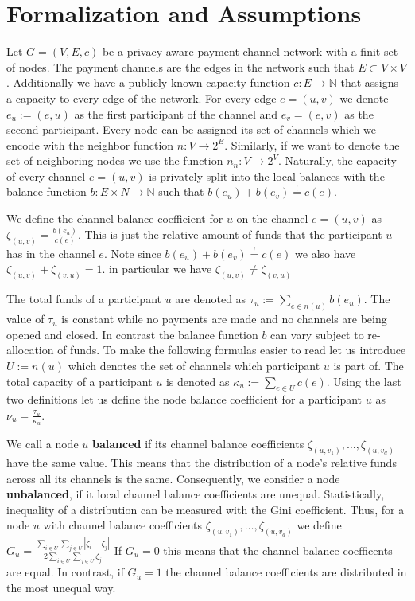 \documentclass[a4paper]{paper}
\begin{document}
\section{Formalization and Assumptions}
\label{sec:formalization}

Let $G=(V,E,c)$ be a privacy aware payment channel network with a finit set of nodes.
The payment channels are the edges in the network such that $E\subset V\times V$.
Additionally we have a publicly known capacity function $c: E\longrightarrow \mathbb{N}$ that assigns a capacity to every edge of the network.
For every edge $e=(u,v)$ we denote $e_u:=(e,u)$ as the first participant of the channel and $e_v=(e,v)$ as the second participant.
Every node can be assigned its set of channels which we encode with the neighbor function $n : V \longrightarrow 2^{E}$.
Similarly, if we want to denote the set of neighboring nodes we use the function $n_n : V \longrightarrow 2^{V}$.
Naturally, the capacity of every channel $e=(u,v)$ is privately split into the local balances with the balance function $b: E\times N\longrightarrow\mathbb{N}$ such that $b(e_u)+b(e_v)\stackrel{!}{=}c(e)$.

We define the channel balance coefficient for $u$ on the channel $e=(u,v)$ as  $\zeta_{(u,v)} = \frac{b(e_u)}{c(e)}$.
This is just the relative amount of funds that the participant $u$ has in the channel $e$.
Note since $b(e_u)+b(e_v)\stackrel{!}{=}c(e)$ we also have $\zeta_{(u,v)} + \zeta_{(v,u)}=1$.
in particular we have $\zeta_{(u,v)} \neq \zeta_{(v,u)}$ 

The total funds of a participant $u$ are denoted as $\tau_u:=\displaystyle{\sum_{e\in n(u)}b(e_u)}$.
The value of $\tau_u$ is constant while no payments are made and no channels are being opened and closed.
In contrast the balance function $b$ can vary subject to re-allocation of funds.
To make the following formulas easier to read let us introduce $U:=n(u)$ which denotes the set of channels which participant $u$ is part of.
The total capacity of a participant $u$ is denoted as $\kappa_u:=\displaystyle{\sum_{e\in U}c(e)}$.
Using the last two definitions let us define the node balance coefficient for a participant $u$ as $\nu_u = \frac{\tau_u}{\kappa_u}$.

We call a node $u$ {\bf balanced} if its channel balance coefficients $\zeta_{(u,v_1)},\dots,\zeta_{(u,v_d)}$ have the same value.
This means that the distribution of a node's relative funds across all its channels is the same.
Consequently, we consider a node {\bf unbalanced}, if it local channel balance coefficients are unequal.
Statistically, inequality of a distribution can be measured with the Gini coefficient.
Thus, for a node $u$ with channel balance coefficients $\zeta_{(u,v_1)},\dots,\zeta_{(u,v_d)}$ we define $G_u = \frac{\displaystyle{\sum_{i\in U} \sum_{j \in U}} | \zeta_i - \zeta_j |}{2 \displaystyle{\sum_{i \in U} \sum_{j \in U} \zeta_j}}$
If $G_u = 0$ this means that the channel balance coefficents are equal.
In contrast, if $G_u = 1$ the channel balance coefficients are distributed in the most unequal way.
\end{document}
